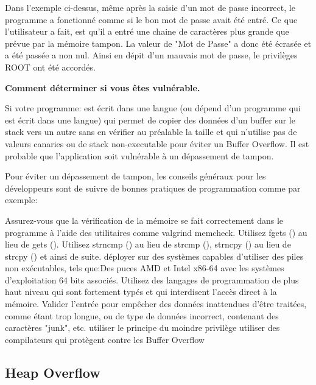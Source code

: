 \begin{flushleft}
Dans l'exemple ci-dessus, même après la saisie d'un mot de passe incorrect, le programme a fonctionné comme si le bon mot de passe avait été entré.
Ce que l'utilisateur a fait, est qu'il a entré une chaine de caractères plus grande que prévue par la mémoire tampon. La valeur de "Mot de Passe" a donc été écrasée et a été passée a non nul. Ainsi en dépit d'un mauvais mot de passe, le privilèges ROOT ont été accordés.
\end{flushleft}

\begin{flushleft}
\textbf{Comment déterminer si vous êtes vulnérable.}
\end{flushleft}

\begin{flushleft}
Si votre programme:
est écrit dans une langue (ou dépend d'un programme qui est écrit dans une langue) qui permet de copier des données d'un buffer sur le stack vers un autre sans en vérifier au préalable la taille et qui n'utilise pas de valeurs canaries ou de stack non-executable pour éviter un Buffer Overflow. Il est probable que l'application soit vulnérable à un dépassement de tampon.
\end{flushleft}

\begin{flushleft}
Pour éviter un dépassement de tampon, les conseils généraux pour les développeurs sont de suivre de bonnes pratiques de programmation comme par exemple: 
\end{flushleft}
\begin{flushleft}
Assurez-vous que la vérification de la mémoire se fait correctement dans le programme à l'aide des utilitaires comme valgrind memcheck.
Utilisez fgets () au lieu de gets ().
Utilisez strncmp () au lieu de strcmp (), strncpy () au lieu de strcpy () et ainsi de suite. déployer sur des systèmes capables d'utiliser des piles non exécutables, tels que:Des puces AMD et Intel x86-64  avec les systèmes d'exploitation 64 bits associés.
Utilisez des langages de programmation de plus haut niveau qui sont fortement typés et qui interdisent l'accès direct à la mémoire.
Valider l'entrée pour empêcher  des données inattendues d'être traitées, comme étant trop longue, ou de type de données incorrect, contenant des caractères "junk", etc.
utiliser le principe du moindre privilège
utiliser des compilateurs qui protègent contre les Buffer Overflow 
\end{flushleft}

\subsection{Heap Overflow}\label{vulnerabilites:applicatives:buffer-overflow:heap}


